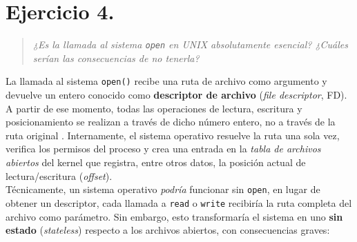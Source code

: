 \documentclass[12pt,letterpaper]{article}
\begin{document}


\newpage

\section*{Ejercicio 4.}

\begin{quote}
  \textit{¿Es la llamada al sistema \texttt{open} en UNIX absolutamente esencial? ¿Cuáles serían las
    consecuencias de no tenerla?}
\end{quote}

\bigskip

\noindent
La llamada al sistema \texttt{open()} recibe una ruta de archivo como argumento y devuelve un entero conocido
como \textbf{descriptor de archivo} (\textit{file descriptor}, FD). A partir de ese momento, todas las
operaciones de lectura, escritura y posicionamiento se realizan a través de dicho número entero, no a través de
la ruta original \cite{tanenbaum2015}. Internamente, el sistema operativo resuelve la ruta una sola vez, verifica
los permisos del proceso y crea una entrada en la \textit{tabla de archivos abiertos} del kernel que registra,
entre otros datos, la posición actual de lectura/escritura (\textit{offset}).\\

\noindent
Técnicamente, un sistema operativo \emph{podría} funcionar sin \texttt{open}, en lugar de obtener un descriptor,
cada llamada a \texttt{read} o \texttt{write} recibiría la ruta completa del archivo como parámetro. Sin embargo,
esto transformaría el sistema en uno \textbf{sin estado} (\textit{stateless}) respecto a los archivos abiertos,
con consecuencias graves:
\end{document}
